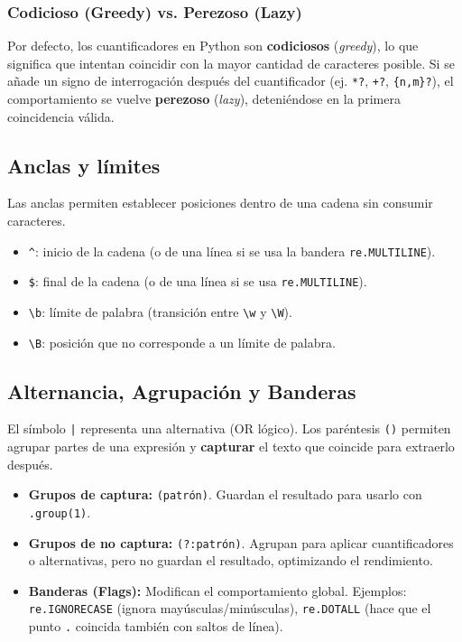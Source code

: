 \documentclass[12pt]{article}
\begin{document}
{\subsubsection*{Codicioso (Greedy) vs. Perezoso (Lazy)}
Por defecto, los cuantificadores en Python son \textbf{codiciosos} (\textit{greedy}), lo que significa que intentan coincidir con la mayor cantidad de caracteres posible. Si se añade un signo de interrogación después del cuantificador (ej. \texttt{*?}, \texttt{+?}, \texttt{\{n,m\}?}), el comportamiento se vuelve \textbf{perezoso} (\textit{lazy}), deteniéndose en la primera coincidencia válida.

\subsection{Anclas y límites}
Las anclas permiten establecer posiciones dentro de una cadena sin consumir caracteres.
\begin{itemize}
\item \texttt{\^{}}: inicio de la cadena (o de una línea si se usa la bandera \texttt{re.MULTILINE}).
\item \texttt{\$}: final de la cadena (o de una línea si se usa \texttt{re.MULTILINE}).
\item \texttt{\textbackslash b}: límite de palabra (transición entre \texttt{\textbackslash w} y \texttt{\textbackslash W}).
\item \texttt{\textbackslash B}: posición que no corresponde a un límite de palabra.
\end{itemize}

\subsection{Alternancia, Agrupación y Banderas}
El símbolo \texttt{|} representa una alternativa (OR lógico). Los paréntesis \texttt{()} permiten agrupar partes de una expresión y \textbf{capturar} el texto que coincide para extraerlo después.
\begin{itemize}
\item \textbf{Grupos de captura:} \texttt{(patrón)}. Guardan el resultado para usarlo con \texttt{.group(1)}.
\item \textbf{Grupos de no captura:} \texttt{(?:patrón)}. Agrupan para aplicar cuantificadores o alternativas, pero no guardan el resultado, optimizando el rendimiento.
\item \textbf{Banderas (Flags):} Modifican el comportamiento global. Ejemplos: \texttt{re.IGNORECASE} (ignora mayúsculas/minúsculas), \texttt{re.DOTALL} (hace que el punto \texttt{.} coincida también con saltos de línea).
\end{itemize}

}
\end{document}
